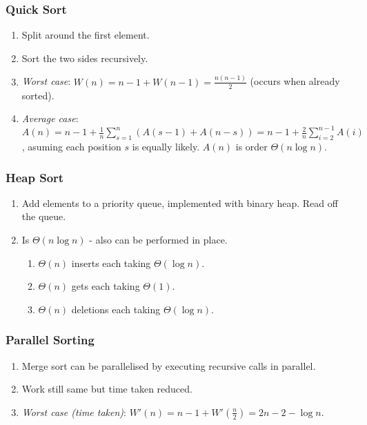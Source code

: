 \documentclass[twocolumn,english]{article}
\begin{document}
\subsubsection{Quick Sort}
\begin{enumerate}
\item Split around the first element.
\item Sort the two sides recursively.
\item \emph{Worst case}: $W\left(n\right)=n-1+W\left(n-1\right)=\frac{n\left(n-1\right)}{2}$
(occurs when already sorted).
\item \emph{Average case}: $A\left(n\right)=n-1+\frac{1}{n}\sum_{s=1}^{n}\left(A\left(s-1\right)+A\left(n-s\right)\right)=n-1+\frac{2}{n}\sum_{i=2}^{n-1}A\left(i\right)$,
asuming each position $s$ is equally likely. $A\left(n\right)$ is
order $\Theta\left(n\log n\right)$.
\end{enumerate}

\subsubsection{Heap Sort}
\begin{enumerate}
\item Add elements to a priority queue, implemented with binary heap. Read
off the queue.
\item Is $\Theta(n\log n)$ - also can be performed in place.

\begin{enumerate}
\item $\Theta\left(n\right)$ inserts each taking $\Theta\left(\log n\right)$.
\item $\Theta\left(n\right)$ gets each taking $\Theta\left(1\right)$.
\item $\Theta\left(n\right)$ deletions each taking $\Theta\left(\log n\right)$.
\end{enumerate}
\end{enumerate}

\subsubsection{Parallel Sorting}
\begin{enumerate}
\item Merge sort can be parallelised by executing recursive calls in parallel.
\item Work still same but time taken reduced.
\item \emph{Worst case (time taken)}: $W'\left(n\right)=n-1+W'\left(\frac{n}{2}\right)=2n-2-\log n$.
\end{enumerate}
\end{document}
